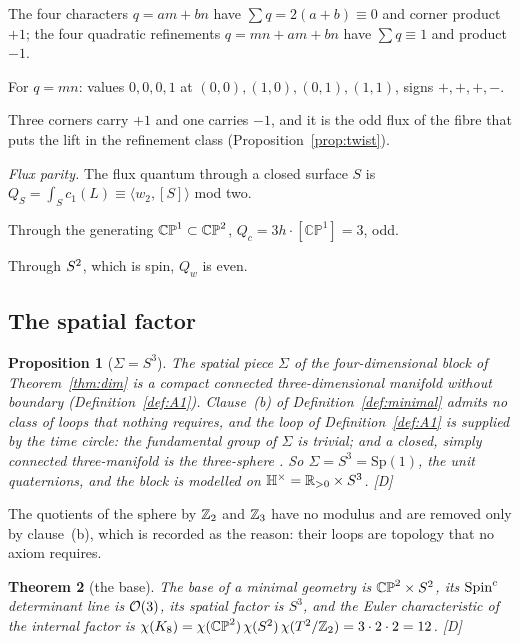\documentclass[11pt,a4paper]{article}
\theoremstyle{plain}
\newtheorem{theorem}{Theorem}[section]
\newtheorem{proposition}[theorem]{Proposition}
\theoremstyle{definition}
\theoremstyle{remark}
\newcommand{\Hquat}{\mathbb{H}}
\newcommand{\rigD}{[\textup{D}]}
\begin{document}
The four characters $q=am+bn$ have $\sum q=2(a+b)\equiv0$ and corner product $+1$; the four quadratic refinements $q=mn+am+bn$ have $\sum q\equiv1$ and product $-1$.

For $q=mn$: values $0,0,0,1$ at $(0,0),(1,0),(0,1),(1,1)$, signs $+,+,+,-$.

Three corners carry $+1$ and one carries $-1$, and it is the odd flux of the fibre that puts the lift in the refinement class (Proposition~\ref{prop:twist}).

\emph{Flux parity.} The flux quantum through a closed surface $S$ is $Q_{S}=\int_{S}c_{1}(L)\equiv\langle w_{2},[S]\rangle$ mod two.

Through the generating $\mathbb{CP}^{1}\subset\mathbb{CP}^2$, $Q_{c}=3h\cdot[\mathbb{CP}^{1}]=3$, odd.

Through $S^2$, which is spin, $Q_{w}$ is even.

\subsection{The spatial factor}

\begin{proposition}[$\Sigma=S^{3}$]\label{prop:S3}
The spatial piece $\Sigma$ of the four-dimensional block of Theorem~\ref{thm:dim} is a compact connected three-dimensional manifold without boundary (Definition~\ref{def:A1}). Clause~(b) of Definition~\ref{def:minimal} admits no class of loops that nothing requires, and the loop of Definition~\ref{def:A1} is supplied by the time circle: the fundamental group of $\Sigma$ is trivial; and a closed, simply connected three-manifold is the three-sphere \cite{MorganTian}. So $\Sigma=S^{3}=\mathrm{Sp}(1)$, the unit quaternions, and the block is modelled on $\Hquat^{\times}=\R_{>0}\times S^{3}$. \rigD
\end{proposition}

The quotients of the sphere by $\mathbb{Z}_{2}$ and $\mathbb{Z}_{3}$ have no modulus and are removed only by clause~(b), which is recorded as the reason: their loops are topology that no axiom requires.

\begin{theorem}[the base]\label{thm:base}
The base of a minimal geometry is $\mathbb{CP}^2\times S^2$, its $\text{Spin}^c$ determinant line is $\mathcal{O}(3)$, its spatial factor is $S^{3}$, and the Euler characteristic of the internal factor is $\chi(K_8)=\chi(\mathbb{CP}^2)\,\chi(S^2)\,\chi(T^2/\mathbb{Z}_2)=3\cdot2\cdot2=12$. \rigD
\end{theorem}
\end{document}
